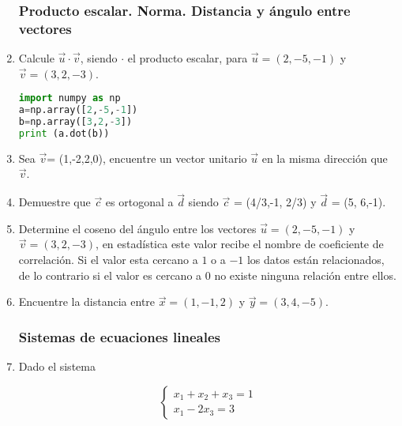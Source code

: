  \begin{enumerate}


\subsubsection{Producto escalar. Norma. Distancia y ángulo entre vectores}

\bigskip

\item
 
 Calcule  $\vec{u} \cdot \vec{v}$, siendo $\cdot$ el producto escalar, para $\vec{u}= (2,-5,-1)$ y $\vec{v} =(3, 2, -3)$.
\begin{lstlisting}[language = python, numbers = none, escapechar = !,
    basicstyle = \ttfamily\bfseries, linewidth = 1\linewidth] 
import numpy as np
a=np.array([2,-5,-1])
b=np.array([3,2,-3])
print (a.dot(b))
\end{lstlisting}

\bigskip

\item
 Sea $\vec{v}$= (1,-2,2,0), encuentre un vector unitario $\vec{u}$ en la misma dirección que $\vec{v}$.
\item
 Demuestre que $\vec{c}$ es ortogonal a  $\vec{d}$ siendo $\vec{c}$ = (4/3,-1, 2/3) y $\vec{d}$ = (5, 6,-1).
\item
 Determine el coseno del ángulo entre los vectores  $\vec{u}= (2,-5,-1)$ y $\vec{v}= (3, 2,-3)$, en estad\'istica este valor recibe el nombre de coeficiente de correlación. Si el valor esta cercano a $1$ o a $-1$ los datos están relacionados, de lo contrario si el valor es cercano a $0$ no existe ninguna relación entre ellos.
\item
 Encuentre la distancia entre $\vec{x} = (1, -1, 2)$ y $\vec{y} = (3,4,-5)$.

\bigskip

\subsubsection{Sistemas de ecuaciones lineales}

\bigskip
 
 
 

 \item
 Dado el sistema

\[
\left\{
\begin{array}{ll}
x_1 + x_2 + x_3 = 1 \\
x_1 - 2x_3= 3
\end{array}
\right.
\]


\end{enumerate}
